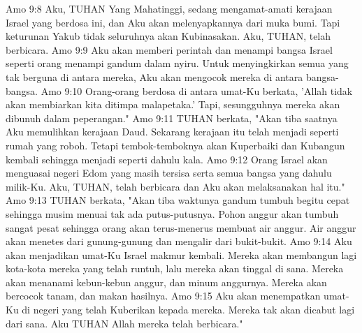 Amo 9:8  Aku, TUHAN Yang Mahatinggi, sedang mengamat-amati kerajaan Israel yang berdosa ini, dan Aku akan melenyapkannya dari muka bumi. Tapi keturunan Yakub tidak seluruhnya akan Kubinasakan. Aku, TUHAN, telah berbicara.
Amo 9:9  Aku akan memberi perintah dan menampi bangsa Israel seperti orang menampi gandum dalam nyiru. Untuk menyingkirkan semua yang tak berguna di antara mereka, Aku akan mengocok mereka di antara bangsa-bangsa.
Amo 9:10  Orang-orang berdosa di antara umat-Ku berkata, 'Allah tidak akan membiarkan kita ditimpa malapetaka.' Tapi, sesungguhnya mereka akan dibunuh dalam peperangan."
Amo 9:11  TUHAN berkata, "Akan tiba saatnya Aku memulihkan kerajaan Daud. Sekarang kerajaan itu telah menjadi seperti rumah yang roboh. Tetapi tembok-temboknya akan Kuperbaiki dan Kubangun kembali sehingga menjadi seperti dahulu kala.
Amo 9:12  Orang Israel akan menguasai negeri Edom yang masih tersisa serta semua bangsa yang dahulu milik-Ku. Aku, TUHAN, telah berbicara dan Aku akan melaksanakan hal itu."
Amo 9:13  TUHAN berkata, "Akan tiba waktunya gandum tumbuh begitu cepat sehingga musim menuai tak ada putus-putusnya. Pohon anggur akan tumbuh sangat pesat sehingga orang akan terus-menerus membuat air anggur. Air anggur akan menetes dari gunung-gunung dan mengalir dari bukit-bukit.
Amo 9:14  Aku akan menjadikan umat-Ku Israel makmur kembali. Mereka akan membangun lagi kota-kota mereka yang telah runtuh, lalu mereka akan tinggal di sana. Mereka akan menanami kebun-kebun anggur, dan minum anggurnya. Mereka akan bercocok tanam, dan makan hasilnya.
Amo 9:15  Aku akan menempatkan umat-Ku di negeri yang telah Kuberikan kepada mereka. Mereka tak akan dicabut lagi dari sana. Aku TUHAN Allah mereka telah berbicara."


